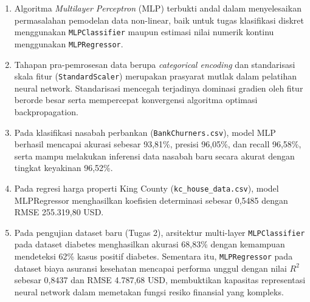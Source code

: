 \documentclass[a4paper,oneside,12pt]{report}
\begin{document}
\begin{enumerate}
    \item Algoritma \textit{Multilayer Perceptron} (MLP) terbukti andal dalam menyelesaikan permasalahan pemodelan data non-linear, baik untuk tugas klasifikasi diskret menggunakan \texttt{MLPClassifier} maupun estimasi nilai numerik kontinu menggunakan \texttt{MLPRegressor}.
    \item Tahapan pra-pemrosesan data berupa \textit{categorical encoding} dan standarisasi skala fitur (\texttt{StandardScaler}) merupakan prasyarat mutlak dalam pelatihan neural network. Standarisasi mencegah terjadinya dominasi gradien oleh fitur berorde besar serta mempercepat konvergensi algoritma optimasi backpropagation.
    \item Pada klasifikasi nasabah perbankan (\texttt{BankChurners.csv}), model MLP berhasil mencapai akurasi sebesar 93,81\%, presisi 96,05\%, dan recall 96,58\%, serta mampu melakukan inferensi data nasabah baru secara akurat dengan tingkat keyakinan 96,52\%.
    \item Pada regresi harga properti King County (\texttt{kc\_house\_data.csv}), model MLPRegressor menghasilkan koefisien determinasi sebesar 0,5485 dengan RMSE 255.319,80 USD.
    \item Pada pengujian dataset baru (Tugas 2), arsitektur multi-layer \texttt{MLPClassifier} pada dataset diabetes menghasilkan akurasi 68,83\% dengan kemampuan mendeteksi 62\% kasus positif diabetes. Sementara itu, \texttt{MLPRegressor} pada dataset biaya asuransi kesehatan mencapai performa unggul dengan nilai $R^2$ sebesar 0,8437 dan RMSE 4.787,68 USD, membuktikan kapasitas representasi neural network dalam memetakan fungsi resiko finansial yang kompleks.
\end{enumerate}

\clearpage
\end{document}
